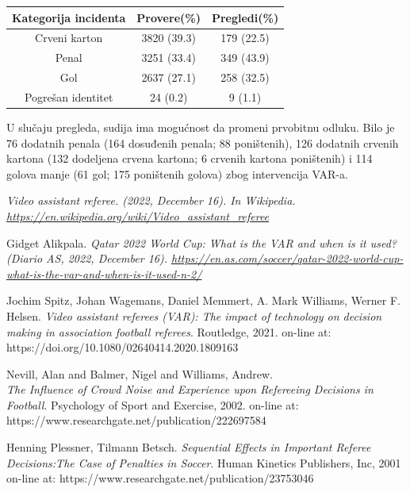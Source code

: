 \documentclass[a4paper]{article}
\begin{document}
\begin{center}
\begin{tabular}{ |c|c|c| } 
\hline
Kategorija incidenta & Provere(\%) & Pregledi(\%) \\  \hline
 Crveni karton & 3820 (39.3) & 179 (22.5) \\ \hline
 Penal & 3251 (33.4) & 349 (43.9) \\ \hline
 Gol & 2637 (27.1) & 258 (32.5) \\ \hline
 Pogrešan identitet & 24 (0.2) & 9 (1.1) \\
 \hline
\end{tabular}
\end{center}

U slučaju pregleda, sudija ima mogućnost da promeni prvobitnu odluku. Bilo je 76 dodatnih penala (164 dosuđenih penala; 88 poništenih), 126 dodatnih crvenih kartona (132 dodeljena crvena kartona; 6 crvenih kartona poništenih) i 114 golova manje (61 gol; 175 poništenih golova) zbog intervencija VAR-a.



\appendix

\begin{thebibliography}{9}

 \em{Video assistant referee}. (2022, December 16). In Wikipedia. \url{https://en.wikipedia.org/wiki/Video_assistant_referee}  

 Gidget Alikpala. \em{Qatar 2022 World Cup: What is the VAR and when is it used?} (Diario AS, 2022, December 16). \url{https://en.as.com/soccer/qatar-2022-world-cup-what-is-the-var-and-when-is-it-used-n-2/}

\bibitem{} Jochim Spitz, Johan Wagemans, Daniel Memmert, A. Mark Williams, Werner F. Helsen. \emph{Video assistant referees (VAR): The impact of technology on decision making in association football referees}. Routledge, 2021. on-line at: https://doi.org/10.1080/02640414.2020.1809163

\bibitem{} Nevill, Alan and Balmer, Nigel and Williams, Andrew. \\ \emph{The Influence of Crowd Noise and Experience upon Refereeing Decisions in Football}. Psychology of Sport and Exercise, 2002. on-line at: https://www.researchgate.net/publication/222697584

\bibitem{} Henning Plessner, Tilmann Betsch. \emph{Sequential Effects in Important Referee Decisions:The Case of Penalties in Soccer}. Human Kinetics Publishers, Inc, 2001 on-line at: https://www.researchgate.net/publication/23753046


\end{thebibliography}
\end{document}
